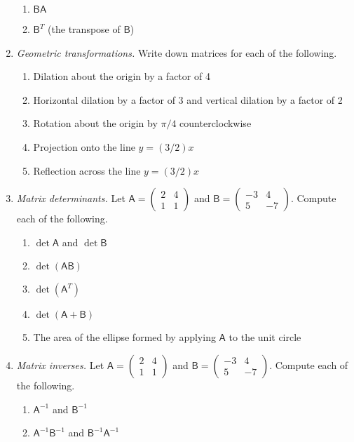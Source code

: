 \begin{enumerate}
\begin{enumerate}
\item $\mathsf{BA}$
\item $\mathsf{B}^T$ (the transpose of $\mathsf{B}$)
\end{enumerate}
\item \emph{Geometric transformations.} Write down matrices for each of the following.
\begin{enumerate}
\item Dilation about the origin by a factor of 4
\item Horizontal dilation by a factor of 3 and vertical dilation by a factor of 2
\item Rotation about the origin by $\pi/4$ counterclockwise
\item Projection onto the line $y = (3/2)x$
\item Reflection across the line $y = (3/2)x$
\end{enumerate}
\item \emph{Matrix determinants.} Let $\mathsf{A} = \begin{pmatrix} 2 & 4 \\ 1 & 1 \end{pmatrix}$ and $\mathsf{B} = \begin{pmatrix} -3 & 4 \\ 5 & -7 \end{pmatrix}$. Compute each of the following.
\begin{enumerate}
\item $\det\mathsf{A}$ and $\det\mathsf{B}$
\item $\det(\mathsf{AB})$
\item $\det(\mathsf{A}^T)$
\item $\det(\mathsf{A} + \mathsf{B})$
\item The area of the ellipse formed by applying $\mathsf{A}$ to the unit circle
\end{enumerate}
\item \emph{Matrix inverses.} Let $\mathsf{A} = \begin{pmatrix} 2 & 4 \\ 1 & 1 \end{pmatrix}$ and $\mathsf{B} = \begin{pmatrix} -3 & 4 \\ 5 & -7 \end{pmatrix}$. Compute each of the following.
\begin{enumerate}
\item $\mathsf{A}^{-1}$ and $\mathsf{B}^{-1}$
\item $\mathsf{A}^{-1}\mathsf{B}^{-1}$ and $\mathsf{B}^{-1}\mathsf{A}^{-1}$

\end{enumerate}
\end{enumerate}

